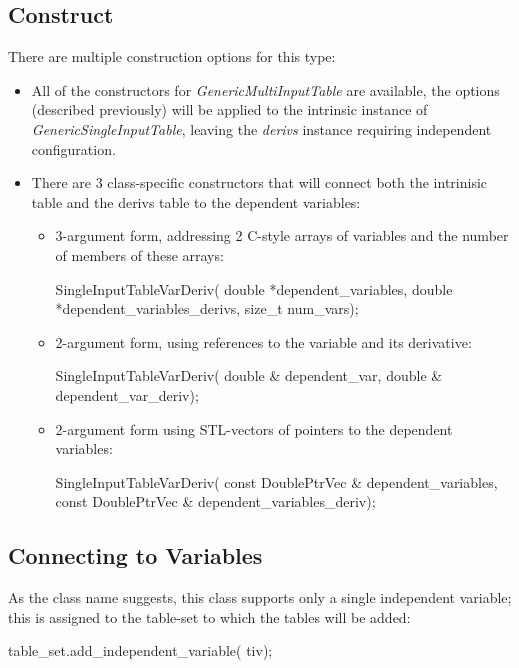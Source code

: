 \documentclass[11pt,fleqn]{report}
\begin{document}
\subsection{Construct}
There are multiple construction options for this type:
\begin{itemize}
\item All of the constructors for \textit{GenericMultiInputTable} are
available, the options (described previously) will be applied to the intrinsic
instance of \textit{GenericSingleInputTable}, leaving the \textit{derivs}
instance requiring independent configuration.
\item There are 3 class-specific constructors that will connect both the
intrinisic table and the derivs table to the dependent variables:
  \begin{itemize}
  \item 3-argument form, addressing 2 C-style arrays of variables and the number
  of members of these arrays:
  \begin{code}
  SingleInputTableVarDeriv(
            double *dependent_variables,
            double *dependent_variables_derivs,
            size_t num_vars);
  \end{code}

  \item 2-argument form, using references to the variable and its derivative:
  \begin{code}
  SingleInputTableVarDeriv( double & dependent_var,
                            double & dependent_var_deriv);
  \end{code}

  \item 2-argument form using STL-vectors of pointers to the dependent variables:
  \begin{code}
  SingleInputTableVarDeriv(
            const DoublePtrVec & dependent_variables,
            const DoublePtrVec & dependent_variables_deriv);
  \end{code}
  \end{itemize}
\end{itemize}

\subsection{Connecting to Variables}
As the class name suggests, this class supports only a single independent
variable; this is assigned to the table-set to which the tables will be added:
\begin{code}
table_set.add_independent_variable( tiv);
\end{code}
\end{document}
